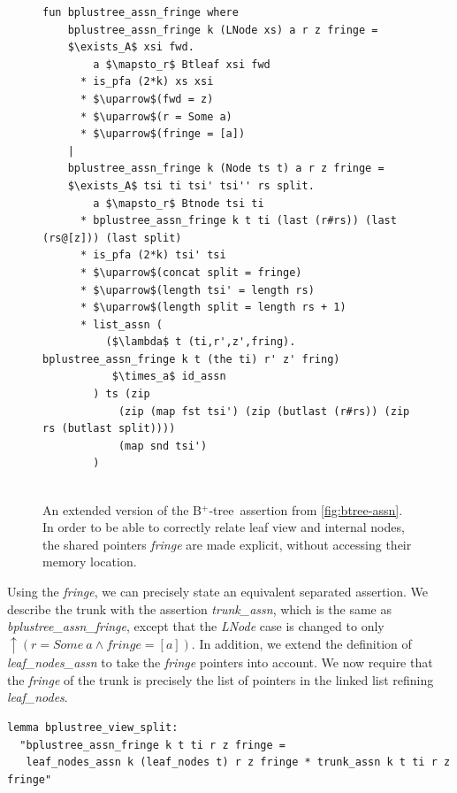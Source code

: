\documentclass[a4paper,UKenglish,cleveref, autoref, thm-restate]{lipics-v2021}
\newcommand{\btree}{B$^+$-tree}
\begin{document}
\begin{figure}
    \centering
\begin{lstlisting}[mathescape=true, language=Isabelle,label=lst:btree-assn-leafs]
fun bplustree_assn_fringe where
    bplustree_assn_fringe k (LNode xs) a r z fringe =
    $\exists_A$ xsi fwd.
        a $\mapsto_r$ Btleaf xsi fwd
      * is_pfa (2*k) xs xsi
      * $\uparrow$(fwd = z)
      * $\uparrow$(r = Some a)
      * $\uparrow$(fringe = [a])
    |
    bplustree_assn_fringe k (Node ts t) a r z fringe =
    $\exists_A$ tsi ti tsi' tsi'' rs split.
        a $\mapsto_r$ Btnode tsi ti
      * bplustree_assn_fringe k t ti (last (r#rs)) (last (rs@[z])) (last split)
      * is_pfa (2*k) tsi' tsi
      * $\uparrow$(concat split = fringe)
      * $\uparrow$(length tsi' = length rs)
      * $\uparrow$(length split = length rs + 1)
      * list_assn (
          ($\lambda$ t (ti,r',z',fring). bplustree_assn_fringe k t (the ti) r' z' fring)
           $\times_a$ id_assn
        ) ts (zip 
            (zip (map fst tsi') (zip (butlast (r#rs)) (zip rs (butlast split))))
            (map snd tsi')
        )
       
\end{lstlisting}
    \caption[\btree\ assertion with extracted fringe]{
        An extended version of the \btree\ assertion from \autoref{fig:btree-assn}.
        In order to be able to correctly relate leaf view and internal nodes,
        the shared pointers \emph{fringe} are made explicit, without accessing their memory location.
    }
    \label{fig:btree-assn-leafs}
\end{figure}


Using the \emph{fringe}, we can precisely state an equivalent separated assertion.
We describe the trunk with the assertion \emph{trunk\_assn},
which is the same as \emph{bplustree\_assn\_fringe},
except that the \emph{LNode} case is changed to only $\uparrow(r = \mathit{Some}\ a \wedge \mathit{fringe} = [a])$.
In addition, we extend the definition of \emph{leaf\_nodes\_assn}
to take the \emph{fringe} pointers into account.
We now require that the \emph{fringe} of the trunk is
precisely the list of pointers in the linked list refining \emph{leaf\_nodes}.

\begin{lstlisting}[mathescape=true, language=Isabelle,label=lst:btree-view-split]
lemma bplustree_view_split:
  "bplustree_assn_fringe k t ti r z fringe =
   leaf_nodes_assn k (leaf_nodes t) r z fringe * trunk_assn k t ti r z fringe"
\end{lstlisting}
\end{document}
